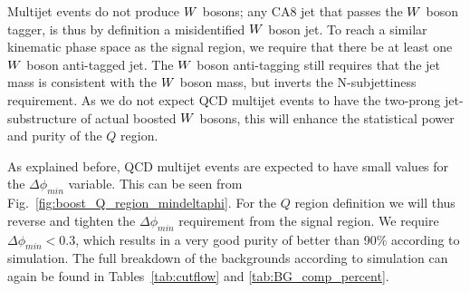 Multijet events do not produce $W$ bosons; any CA8 jet that passes the $W$ boson tagger,
is thus by definition a misidentified $W$ boson jet. To reach a similar kinematic phase space as
the signal region, we require that there be at least one $W$ boson anti-tagged jet. The $W$ boson
anti-tagging still requires that the jet mass is consistent with the $W$ boson mass, but inverts
the N-subjettiness requirement. As we do not expect QCD multijet events to have the two-prong
jet-substructure of actual boosted $W$ bosons, this will enhance the statistical power and purity
of the $Q$ region. 

As explained before, QCD multijet events are expected to have small values for the
$\Delta\phi_{min}$ variable. This can be seen from Fig.~\ref{fig:boost_Q_region_mindeltaphi}. 
For the $Q$ region definition we will thus reverse
and tighten the $\Delta\phi_{min}$ requirement from the signal region. We require $\Delta\phi_{min}
< 0.3$, which results in a very good purity of better than 90\% according to simulation. 
The full breakdown of the backgrounds according to simulation can again be found in
Tables~\ref{tab:cutflow} and \ref{tab:BG_comp_percent}.



